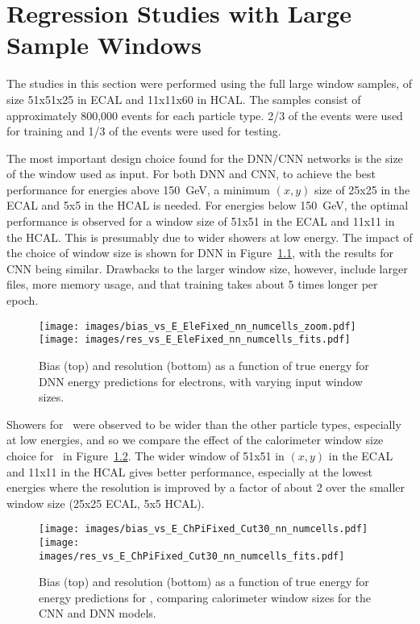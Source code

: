 \chapter{Regression Studies with Large Sample Windows}\label{app:large_window_regression}

The studies in this section were performed using the full large window samples, of size 51x51x25 in ECAL and 11x11x60 in HCAL.
The samples consist of approximately 800,000 events for each particle type.  2/3 of the events were used for training and 1/3 of the events were used for testing.

The most important design choice found for the DNN/CNN networks is the size of the window used as input.  For both DNN and CNN, to achieve the best performance for energies above 150~GeV, a minimum $(x,y)$ size of 25x25 in the ECAL and 5x5 in the HCAL is needed.  For energies below 150~GeV, the optimal performance is observed for a window size of 51x51 in the ECAL and 11x11 in the HCAL.  This is presumably due to wider showers at low energy.  The impact of the choice of window size is shown for DNN in Figure~\ref{fig:reg_dnn_numcells}, with the results for CNN being similar.  Drawbacks to the larger window size, however, include larger files, more memory usage, and that training takes about 5 times longer per epoch.

\begin{figure}[htbp]
\centering
\texttt{[image: images/bias\_vs\_E\_EleFixed\_nn\_numcells\_zoom.pdf]}
\texttt{[image: images/res\_vs\_E\_EleFixed\_nn\_numcells\_fits.pdf]}
\caption{Bias (top) and resolution (bottom) as a function of true energy for DNN energy predictions for electrons, with varying input window sizes.
}
\label{fig:reg_dnn_numcells}
\end{figure}

Showers for \chpi\ were observed to be wider than the other particle types, especially at low energies, and so we compare the effect of the calorimeter window size choice for \chpi\ in Figure~\ref{fig:reg_nn_numcells_chpi_large_window}.  The wider window of 51x51 in $(x,y)$ in the ECAL and 11x11 in the HCAL gives better performance, especially at the lowest energies where the resolution is improved by a factor of about 2 over the smaller window size (25x25 ECAL, 5x5 HCAL).

\begin{figure}[htbp]
\centering
\texttt{[image: images/bias\_vs\_E\_ChPiFixed\_Cut30\_nn\_numcells.pdf]}
\texttt{[image: images/res\_vs\_E\_ChPiFixed\_Cut30\_nn\_numcells\_fits.pdf]}
\caption{Bias (top) and resolution (bottom) as a function of true energy for energy predictions for \chpi, comparing calorimeter window sizes for the CNN and DNN models.
}
\label{fig:reg_nn_numcells_chpi_large_window}
\end{figure}

